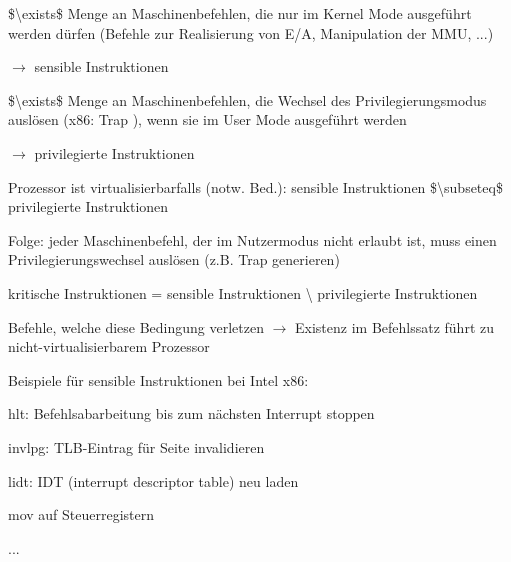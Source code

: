 \documentclass[a4paper]{article}
\begin{document}
\begin{multicols}{3}
    \begin{itemize*}
        \item
        \$\textbackslash exists\$ Menge an Maschinenbefehlen, die nur im
        Kernel Mode ausgeführt werden dürfen (Befehle zur Realisierung von
        E/A, Manipulation der MMU, ...)
        \begin{itemize*}
            \item $\rightarrow$  sensible Instruktionen
        \end{itemize*}
        \item
        \$\textbackslash exists\$ Menge an Maschinenbefehlen, die Wechsel des
        Privilegierungsmodus auslösen (x86: Trap ), wenn sie im User Mode
        ausgeführt werden
        \begin{itemize*}
            \item $\rightarrow$  privilegierte Instruktionen
        \end{itemize*}
        \item
        Prozessor ist virtualisierbarfalls (notw. Bed.): sensible
        Instruktionen \$\textbackslash subseteq\$ privilegierte Instruktionen
        \item
        Folge: jeder Maschinenbefehl, der im Nutzermodus nicht erlaubt ist,
        muss einen Privilegierungswechsel auslösen (z.B. Trap generieren)
        \item
        kritische Instruktionen = sensible Instruktionen \textbackslash{}
        privilegierte Instruktionen
        \begin{itemize*}
            \item Befehle, welche diese Bedingung verletzen $\rightarrow$  Existenz im Befehlssatz führt zu nicht-virtualisierbarem Prozessor
        \end{itemize*}
        \item
        Beispiele für sensible Instruktionen bei Intel x86:
        \begin{itemize*}
            \item hlt: Befehlsabarbeitung bis zum nächsten Interrupt stoppen
            \item invlpg: TLB-Eintrag für Seite invalidieren
            \item lidt: IDT (interrupt descriptor table) neu laden
            \item mov auf Steuerregistern
            \item ...
        \end{itemize*}
        \item

\end{itemize*}
\end{multicols}
\end{document}
